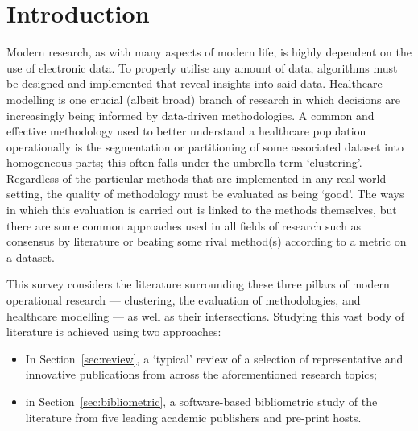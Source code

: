 \section{Introduction}\label{sec:intro}

Modern research, as with many aspects of modern life, is highly dependent on the
use of electronic data. To properly utilise any amount of data, algorithms must
be designed and implemented that reveal insights into said data. Healthcare
modelling is one crucial (albeit broad) branch of research in which decisions
are increasingly being informed by data-driven methodologies. A common and
effective methodology used to better understand a healthcare population
operationally is the segmentation or partitioning of some associated dataset
into homogeneous parts; this often falls under the umbrella term `clustering'. 
Regardless of the particular methods that are implemented in any real-world
setting, the quality of methodology must be evaluated as being `good'. The ways
in which this evaluation is carried out is linked to the methods themselves, but
there are some common approaches used in all fields of research such as
consensus by literature or beating some rival method(s) according to a metric on
a dataset.

This survey considers the literature surrounding these three pillars of
modern operational research --- clustering, the evaluation of methodologies, and
healthcare modelling --- as well as their intersections. Studying this vast body
of literature is achieved using two approaches:

\begin{itemize}
    \item In Section~\ref{sec:review}, a `typical' review of a selection of
        representative and innovative publications from across the
        aforementioned research topics;
    \item in Section~\ref{sec:bibliometric}, a software-based bibliometric study
        of the literature from five leading academic publishers and pre-print
        hosts.
\end{itemize}

